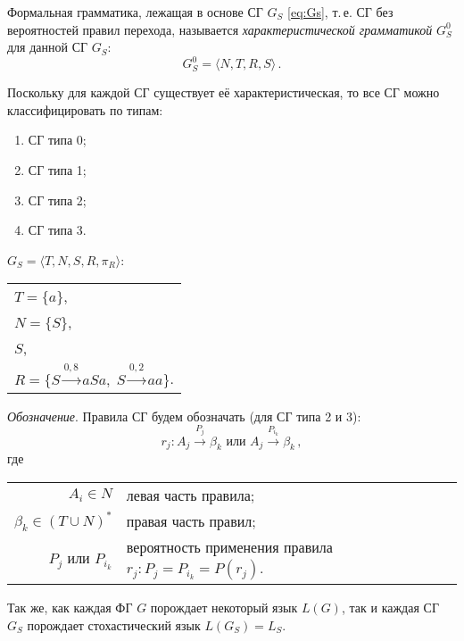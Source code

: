 \begin{defin}
  Формальная грамматика, лежащая в основе СГ $G_S$ \eqref{eq:Gs},
  т.\,е. СГ без вероятностей правил перехода, называется
  \emph{характеристической грамматикой} $G_S^0$ для данной СГ $G_S$:
  \begin{equation}
    \label{eq:Gs0}
    G_S^0 = \langle N, T, R, S \rangle\,.
  \end{equation}
\end{defin}

\begin{rem}
  Поскольку для каждой СГ существует её характеристическая, то все СГ
  можно классифицировать по типам:
  \begin{enumerate}
  \item СГ типа 0;
  \item СГ типа 1;
  \item СГ типа 2;
  \item СГ типа 3.
  \end{enumerate}
\end{rem}

\begin{ex}
  $G_S = \langle T, N, S, R, \pi_R \rangle$:
  \begin{center}
    \begin{tabular}{l}
      $T = \{a\}$,\\
      $N = \{S\}$,\\
      $S$,\\
      $R = \{S \xrightarrow{0{,}8} aSa,\; S \xrightarrow{0{,}2} aa\}$.\\
    \end{tabular}
  \end{center}
\end{ex}

\emph{Обозначение}. Правила СГ будем обозначать (для СГ типа 2 и 3):
\begin{equation}
  \label{eq:rj}
  r_j \colon A_j \xrightarrow{P_j} \beta_k \text{ или } A_j
  \xrightarrow{P_{i_k}} \beta_k\,,
\end{equation}
где\begin{tabular}[t]{r@{\;---\;}l@{}}
  $A_i \in N$ & левая часть правила;\\
  $\beta_k \in (T \cup N)^*$ & правая часть правил;\\
  $P_j$ или $P_{i_k}$ & вероятность применения правила $r_j \colon P_j
  = P_{i_k} = P(r_j)$.
\end{tabular}

Так же, как каждая ФГ $G$ порождает некоторый язык $L(G)$, так и
каждая СГ $G_S$ порождает стохастический язык $L(G_S) = L_S$.

